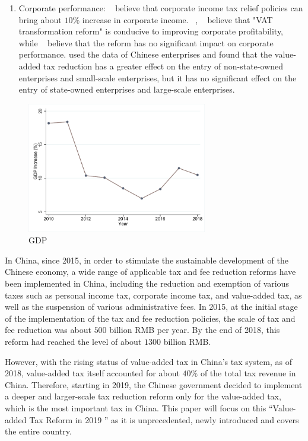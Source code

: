 \documentclass[3p,times]{elsarticle}
\begin{document}
\begin{enumerate}[(1)]
    \item Corporate performance: ~\citet{strulik2010anticipated} believe that corporate income tax relief policies can bring about $10\%$ increase in corporate income. {\color{red} ~\citet{yang2006addvalue}, ~\citet{wang2010Research}} believe that "VAT transformation reform" is conducive to improving corporate profitability, while {\color{red} ~\citet{liu2012Value}} believe that the reform has no significant impact on corporate performance. {} used the data of Chinese enterprises and found that the value-added tax reduction has a greater effect on the entry of non-state-owned enterprises and small-scale enterprises, but it has no significant effect on the entry of state-owned enterprises and large-scale enterprises.
\end{enumerate}

\begin{figure}
    \centering
    \includegraphics[width=0.7\textwidth]{1.pdf}
    \caption{\color{red}GDP}
    \label{fig:gdp}
\end{figure}
In China, since 2015, in order to stimulate the sustainable development of the Chinese economy, a wide range of applicable tax and fee reduction reforms have been implemented in China, including the reduction and exemption of various taxes such as personal income tax, corporate income tax, and value-added tax, as well as the suspension of various administrative fees. In 2015, at the initial stage of the implementation of the tax and fee reduction policies, the scale of tax and fee reduction was about $500$ billion RMB per year. By the end of 2018, this reform had reached the level of about $1300$ billion RMB.

However, with the rising status of value-added tax in China's tax system, as of 2018, value-added tax itself accounted for about $40\%$ of the total tax revenue in China. Therefore, starting in 2019, the Chinese government decided to implement a deeper and larger-scale tax reduction reform only for the value-added tax, which is the most important tax in China. This paper will focus on this “Value-added Tax Reform in 2019 ” as it is unprecedented, newly introduced and covers the entire country.
\end{document}
